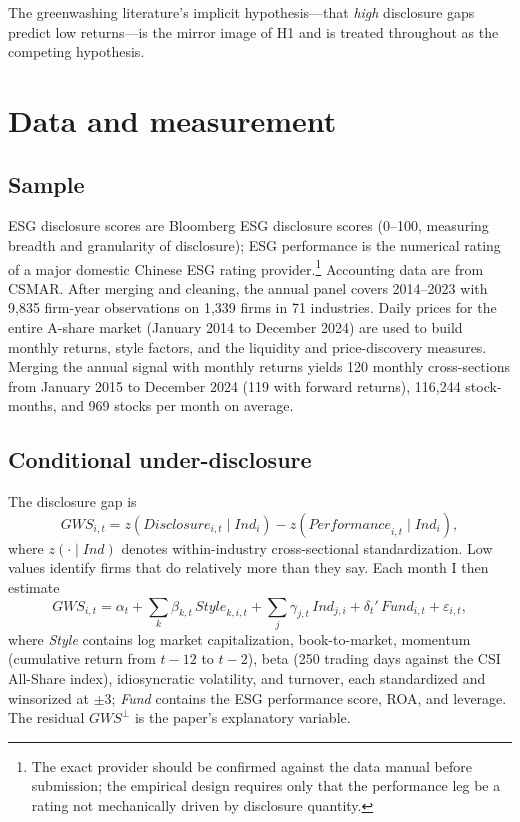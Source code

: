 \documentclass[12pt]{article}
\newcommand{\gws}{\textit{GWS}}
\newcommand{\gwsp}{\ensuremath{\textit{GWS}^{\perp}}}
\begin{document}
\noindent The greenwashing literature's implicit hypothesis---that \emph{high}
disclosure gaps predict low returns---is the mirror image of H1 and is treated
throughout as the competing hypothesis.

\section{Data and measurement}

\subsection{Sample}
ESG disclosure scores are Bloomberg ESG disclosure scores (0--100, measuring
breadth and granularity of disclosure); ESG performance is the numerical rating
of a major domestic Chinese ESG rating provider.\footnote{The exact provider
should be confirmed against the data manual before submission; the empirical
design requires only that the performance leg be a rating not mechanically
driven by disclosure quantity.} Accounting data are from CSMAR. After merging
and cleaning, the annual panel covers 2014--2023 with 9{,}835 firm-year
observations on 1{,}339 firms in 71 industries. Daily prices for the entire
A-share market (January 2014 to December 2024) are used to build monthly
returns, style factors, and the liquidity and price-discovery measures.
Merging the annual signal with monthly returns yields 120 monthly cross-sections
from January 2015 to December 2024 (119 with forward returns), 116{,}244
stock-months, and 969 stocks per month on average.

\subsection{Conditional under-disclosure}
The disclosure gap is
\begin{equation}
\gws_{i,t} = z\!\left(\textit{Disclosure}_{i,t}\mid \textit{Ind}_i\right)
           - z\!\left(\textit{Performance}_{i,t}\mid \textit{Ind}_i\right),
\end{equation}
where $z(\cdot\mid \textit{Ind})$ denotes within-industry cross-sectional
standardization. Low values identify firms that do relatively more than they
say. Each month I then estimate
\begin{equation}
\gws_{i,t} = \alpha_t + \sum_k \beta_{k,t}\,\textit{Style}_{k,i,t}
           + \sum_j \gamma_{j,t}\,\textit{Ind}_{j,i}
           + \delta_t'\,\textit{Fund}_{i,t} + \varepsilon_{i,t},
\end{equation}
where \textit{Style} contains log market capitalization, book-to-market,
momentum (cumulative return from $t-12$ to $t-2$), beta (250 trading days
against the CSI All-Share index), idiosyncratic volatility, and turnover, each
standardized and winsorized at $\pm 3$; \textit{Fund} contains the ESG
performance score, ROA, and leverage. The residual \gwsp{} is the paper's
explanatory variable.
\end{document}
